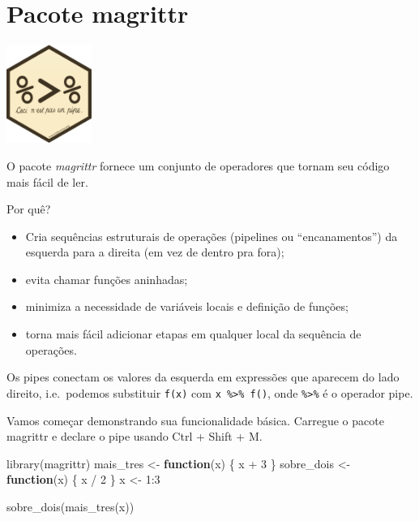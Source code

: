 \documentclass[
]{book}
\newenvironment{Shaded}{\begin{snugshade}}{\end{snugshade}}
\newcommand{\ControlFlowTok}[1]{\textcolor[rgb]{0.13,0.29,0.53}{\textbf{#1}}}
\newcommand{\DecValTok}[1]{\textcolor[rgb]{0.00,0.00,0.81}{#1}}
\newcommand{\FunctionTok}[1]{\textcolor[rgb]{0.00,0.00,0.00}{#1}}
\newcommand{\NormalTok}[1]{#1}
\newcommand{\OtherTok}[1]{\textcolor[rgb]{0.56,0.35,0.01}{#1}}
\newcommand{\SpecialCharTok}[1]{\textcolor[rgb]{0.00,0.00,0.00}{#1}}
\providecommand{\tightlist}{%
  \setlength{\itemsep}{0pt}\setlength{\parskip}{0pt}}
\begin{document}
\hypertarget{pacote-magrittr}{%
\section{Pacote magrittr}\label{pacote-magrittr}}

\begin{center}\includegraphics[width=1.09in]{figuras/logo} \end{center}

O pacote \emph{magrittr} fornece um conjunto de operadores que tornam seu código mais fácil de ler.

Por quê?

\begin{itemize}
\tightlist
\item
  Cria sequências estruturais de operações (pipelines ou ``encanamentos'') da esquerda para a direita (em vez de dentro pra fora);
\item
  evita chamar funções aninhadas;
\item
  minimiza a necessidade de variáveis locais e definição de funções;
\item
  torna mais fácil adicionar etapas em qualquer local da sequência de operações.
\end{itemize}

Os pipes conectam os valores da esquerda em expressões que aparecem do lado direito, i.e.~podemos substituir \texttt{f(x)} com \texttt{x\ \%\textgreater{}\%\ f()}, onde \texttt{\%\textgreater{}\%} é o operador pipe.

Vamos começar demonstrando sua funcionalidade básica. Carregue o pacote magrittr e declare o pipe usando Ctrl + Shift + M.

\begin{Shaded}
\begin{Highlighting}[]
\FunctionTok{library}\NormalTok{(magrittr)}
\NormalTok{mais\_tres }\OtherTok{\textless{}{-}} \ControlFlowTok{function}\NormalTok{(x) \{ x }\SpecialCharTok{+} \DecValTok{3}\NormalTok{ \}}
\NormalTok{sobre\_dois }\OtherTok{\textless{}{-}} \ControlFlowTok{function}\NormalTok{(x) \{ x }\SpecialCharTok{/} \DecValTok{2}\NormalTok{ \}}
\NormalTok{x }\OtherTok{\textless{}{-}} \DecValTok{1}\SpecialCharTok{:}\DecValTok{3}

\FunctionTok{sobre\_dois}\NormalTok{(}\FunctionTok{mais\_tres}\NormalTok{(x))}
\end{Highlighting}
\end{Shaded}
\end{document}

